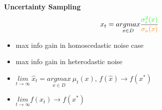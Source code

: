 \documentclass[landscape,a0paper,fontscale=0.285]{baposter} %
\newcommand{\compresslist}{ %
\setlength{\itemsep}{1pt}
\setlength{\parskip}{0pt}
\setlength{\parsep}{0pt}
}
\begin{document}
\begin{poster}
{\colorbox[HTML]{CCFFFF}{}
\textbf{Uncertainty Sampling}
\vspace{-0.3cm}
$$\vspace{-0.3cm}
x_t = \underset{x\in D}{argmax} \frac{\textcolor{green}{\sigma_{e}^2(x)}}{\textcolor{orange}{\sigma_a(x)}}
$$
\vspace{-0.3cm}
\begin{itemize}\compresslist
    \item[\checkmark] max info gain in homoscedastic noise case
    \item[\XSolidBrush] max info gain in heterodastic noise 
    \item[\checkmark] $\underset{t\rightarrow \infty}{lim}~\hat x_t = \underset{x\in D}{argmax}~\mu_t(x)$, $f(\hat x )\rightarrow f(x^*)$
    \item[\XSolidBrush] $\underset{t\rightarrow \infty}{lim} f(x_t)\rightarrow f(x^*)$
\end{itemize}

}
\end{poster}
\end{document}
